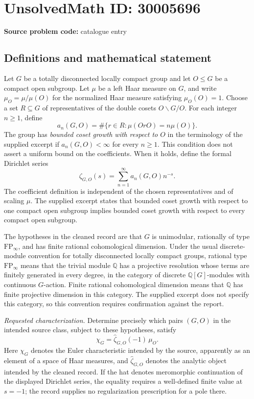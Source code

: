 \documentclass[11pt]{article}
\newcommand{\Q}{\mathbb{Q}}
\begin{document}
\section*{UnsolvedMath ID: 30005696}
\textbf{Source problem code:} catalogue entry
\subsection{Definitions and mathematical statement}
Let \(G\) be a totally disconnected locally compact group and let \(O\leq G\) be a compact open subgroup. Let \(\mu\) be a left Haar measure on \(G\), and write \(\mu_O=\mu/\mu(O)\) for the normalized Haar measure satisfying \(\mu_O(O)=1\). Choose a set \(R\subseteq G\) of representatives of the double cosets \(O\backslash G/O\). For each integer \(n\geq 1\), define
\[
 a_n(G,O)=\#\{r\in R:\mu(OrO)=n\mu(O)\}.
\]
The group has \emph{bounded coset growth with respect to \(O\)} in the terminology of the supplied excerpt if \(a_n(G,O)<\infty\) for every \(n\geq1\). This condition does not assert a uniform bound on the coefficients. When it holds, define the formal Dirichlet series
\[
 \zeta_{G,O}(s)=\sum_{n=1}^{\infty}a_n(G,O)n^{-s}.
\]
The coefficient definition is independent of the chosen representatives and of scaling \(\mu\). The supplied excerpt states that bounded coset growth with respect to one compact open subgroup implies bounded coset growth with respect to every compact open subgroup.

The hypotheses in the cleaned record are that \(G\) is unimodular, rationally of type \(\mathrm{FP}_{\infty}\), and has finite rational cohomological dimension. Under the usual discrete-module convention for totally disconnected locally compact groups, rational type \(\mathrm{FP}_{\infty}\) means that the trivial module \(\Q\) has a projective resolution whose terms are finitely generated in every degree, in the category of discrete \(\Q[G]\)-modules with continuous \(G\)-action. Finite rational cohomological dimension means that \(\Q\) has finite projective dimension in this category. The supplied excerpt does not specify this category, so this convention requires confirmation against the report.

\emph{Requested characterization.} Determine precisely which pairs \((G,O)\) in the intended source class, subject to these hypotheses, satisfy
\[
 \chi_G=\widehat\zeta_{G,O}(-1)\,\mu_O.
\]
Here \(\chi_G\) denotes the Euler characteristic intended by the source, apparently as an element of a space of Haar measures, and \(\widehat\zeta_{G,O}\) denotes the analytic object intended by the cleaned record. If the hat denotes meromorphic continuation of the displayed Dirichlet series, the equality requires a well-defined finite value at \(s=-1\); the record supplies no regularization prescription for a pole there.
\end{document}
